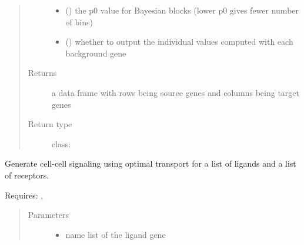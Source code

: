 \documentclass[letterpaper,10pt,english]{sphinxmanual}
\begin{document}
\begin{fulllineitems}
\begin{fulllineitems}
\begin{quote}
\begin{description}
\begin{itemize}
\item {} 
 (\sphinxstyleliteralemphasis{, }) \textendash{} the p0 value for Bayesian blocks (lower p0 gives fewer number of bins)

\item {} 
 (\sphinxstyleliteralemphasis{, }) \textendash{} whether to output the individual values computed with each background gene

\end{itemize}

\item[{Returns}] \leavevmode
a data frame with rows being source genes and columns being target genes

\item[{Return type}] \leavevmode
class:

\end{description}\end{quote}

\end{fulllineitems}


\begin{fulllineitems}
\label{\detokenize{api:spaotsc.SpaOTsc.spatial_sc.spatial_signaling_ot}}
Generate cell-cell signaling using optimal transport for a list of ligands and a list of receptors.

Requires: , 
\begin{quote}\begin{description}
\item[{Parameters}] \leavevmode\begin{itemize}
\item {} 
 \textendash{} name list of the ligand gene


\end{itemize}
\end{description}
\end{quote}
\end{fulllineitems}
\end{fulllineitems}
\end{document}
